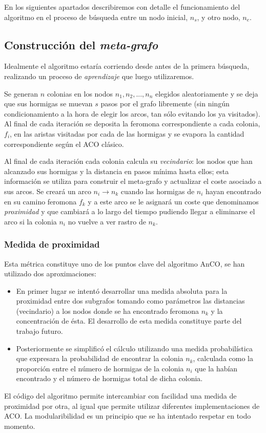 \documentclass{llncs}
\begin{document}
En los siguientes apartados describiremos con detalle el funcionamiento del algoritmo en el proceso de b{\'u}squeda entre un nodo inicial, $n_s$, y otro nodo, $n_e$.

\subsection{Construcci{\'o}n del \textit{meta-grafo}}
Idealmente el algoritmo estar{\'i}a corriendo desde antes de la primera b{\'u}squeda, realizando un proceso de \textit{aprendizaje} que luego utilizaremos.

Se generan $n$ colonias en los nodos $n_1, n_2,..., n_n$ elegidos aleatoriamente y se deja que sus hormigas se muevan $s$ pasos por el grafo libremente (sin ning{\'u}n condicionamiento a la hora de elegir los arcos, tan s{\'o}lo evitando los ya visitados).
Al final de cada iteraci{\'o}n se deposita la feromona correspondiente a cada colonia, $f_i$, en las aristas visitadas por cada de las hormigas y se evapora la cantidad correspondiente seg{\'u}n el ACO cl{\'a}sico.

Al final de cada iteraci{\'o}n cada colonia calcula su \textit{vecindario}: los nodos que han alcanzado sus hormigas y la distancia en pasos m{\'i}nima hasta ellos; esta informaci{\'o}n se utiliza para construir el meta-grafo y actualizar el coste asociado a sus arcos.
Se crear{\'a} un arco $n_i \rightarrow n_k$ cuando las hormigas de $n_i$ hayan encontrado en su camino feromona $f_k$ y a este arco se le asignar{\'a} un coste que denominamos \textit{proximidad} y que cambiar{\'a} a lo largo del tiempo pudiendo llegar a eliminarse el arco si la colonia $n_i$ no vuelve a ver rastro de $n_k$.

\subsubsection{Medida de proximidad}
Esta m{\'e}trica constituye uno de los puntos clave del algoritmo AnCO, se han utilizado dos aproximaciones:
\begin{itemize}
  \item En primer lugar se intent{\'o} desarrollar una medida absoluta para la {proxi}{midad} entre dos subgrafos tomando como par{\'a}metros las distancias (vecindario) a los nodos donde se ha encontrado feromona $n_k$ y la concentraci{\'o}n de {\'e}sta. El desarrollo de esta medida constituye parte del trabajo futuro.
  \item Posteriormente se simplific{\'o} el c{\'a}lculo utilizando una medida probabil{\'i}stica que expresara la probabilidad de encontrar la colonia $n_k$, calculada como la proporci{\'o}n entre el n{\'u}mero de hormigas de la colonia $n_i$ que la hab{\'i}an encontrado y el n{\'u}mero de hormigas total de dicha colonia.
\end{itemize}
El c{\'o}digo del algoritmo permite intercambiar con facilidad una medida de {proxi}{midad} por otra, al igual que permite utilizar diferentes implementaciones de ACO.
La modularibilidad es un principio que se ha intentado respetar en todo momento.
\end{document}
